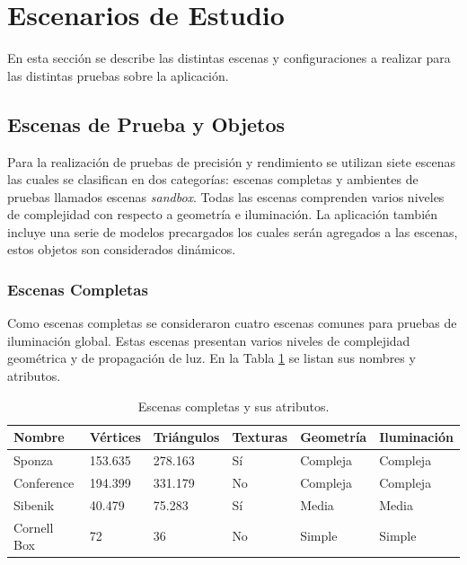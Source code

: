 \section{Escenarios de Estudio}

En esta sección se describe las distintas escenas y configuraciones a realizar para las distintas pruebas sobre la aplicación.

\subsection{Escenas de Prueba y Objetos}

Para la realización de pruebas de precisión y rendimiento se utilizan siete escenas las cuales se clasifican en dos categorías: escenas completas y ambientes de pruebas llamados escenas \emph{sandbox}. Todas las escenas comprenden varios niveles de complejidad con respecto a geometría e iluminación. La aplicación también incluye una serie de modelos precargados los cuales serán agregados a las escenas, estos objetos son considerados dinámicos.

\subsubsection{Escenas Completas}

Como escenas completas se consideraron cuatro escenas comunes para pruebas de iluminación global. Estas escenas presentan varios niveles de complejidad geométrica y de propagación de luz. En la Tabla \ref{tab:scenes_attributes} se listan sus nombres y atributos.

\begin{table}[h]
\centering
\begin{tabular}{|l|l|l|l|l|l|}
\hline
Nombre            & Vértices & Triángulos & Texturas & Geometría & Iluminación \\ \hline
Sponza     & 153.635  & 278.163    & Sí       & Compleja  & Compleja     \\ \hline
Conference   & 194.399  & 331.179    & No       & Compleja  & Compleja     \\ \hline
Sibenik & 40.479   & 75.283     & Sí       & Media     & Media        \\ \hline
Cornell Box       & 72       & 36         & No       & Simple    & Simple       \\ \hline
\end{tabular}
\caption{Escenas completas y sus atributos.}
\label{tab:scenes_attributes}
\end{table}

